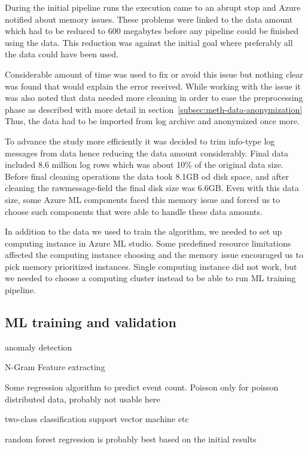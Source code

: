During the initial pipeline runs
the execution came to an abrupt stop
and Azure notified about memory issues.
These problems were linked to the data amount
which had to be reduced to 600 megabytes
before any pipeline could be finished using the data.
This reduction was against the initial goal
where preferably all the data could have been used.

Considerable amount of time was used
to fix or avoid this issue
but nothing clear was found
that would explain the error received.
While working with the issue
it was also noted
that data needed more cleaning
in order to ease the preprocessing phase
as described with more detail in section~\ref{subsec:meth-data-anonymization}
Thus,
the data had to be imported from log archive
and anonymized once more.

To advance the study more efficiently
it was decided to trim info-type log messages from data
hence reducing the data amount considerably.
Final data included 8.6 million log rows
which was about 10\% of the original data size.
Before final cleaning operations
the data took 8.1GB od disk space,
and after cleaning the rawmessage-field
the final disk size was 6.6GB.
Even with this data size,
some Azure ML components faced this memory issue
and forced us to choose such components
that were able to handle these data amounts.


In addition to the data we used to train the algorithm,
we needed to set up computing instance
in Azure ML studio.
Some predefined resource limitations
affected the computing instance choosing
and the memory issue encouraged us
to pick memory prioritized instances.
Single computing instance did not work,
but we needed to choose a computing cluster instead
to be able to run ML training pipeline.





\subsection{ML training and validation}\label{subsec:res-ml-training-and-validation}



\begin{itcomment}
    anomaly detection

    N-Gram Feature extracting

    Some regression algorithm to predict event count.
    Poisson only for poisson distributed data, probably not usable here

    two-class classification
    support vector machine etc

    random forest regression is probably best based on the initial results
\end{itcomment}

